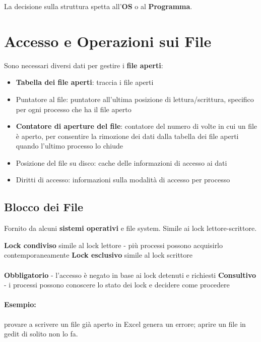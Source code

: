 La decisione sulla struttura spetta all'\textbf{OS} o al \textbf{Programma}.

\section{Accesso e Operazioni sui File}

Sono necessari diversi dati per gestire i \textbf{file aperti}:

\begin{itemize}
    \item \textbf{Tabella dei file aperti}: traccia i file aperti
    \item Puntatore al file: puntatore all'ultima posizione di lettura/scrittura, specifico per ogni processo che ha il file aperto
    \item \textbf{Contatore di aperture del file}: contatore del numero di volte in cui un file è aperto, per consentire la rimozione dei dati dalla tabella dei file aperti quando l'ultimo processo lo chiude
    \item Posizione del file su disco: cache delle informazioni di accesso ai dati
    \item Diritti di accesso: informazioni sulla modalità di accesso per processo
\end{itemize}

\subsection{Blocco dei File}
Fornito da alcuni \textbf{sistemi operativi} e file system. Simile ai lock lettore-scrittore.

\textbf{Lock condiviso} simile al lock lettore - più processi possono acquisirlo contemporaneamente
\textbf{Lock esclusivo} simile al lock scrittore

\paragraph{}

\textbf{Obbligatorio} - l'accesso è negato in base ai lock detenuti e richiesti
\textbf{Consultivo} - i processi possono conoscere lo stato dei lock e decidere come procedere

\paragraph{Esempio: } provare a scrivere un file già aperto in Excel genera un errore; aprire un file in gedit di solito non lo fa.

